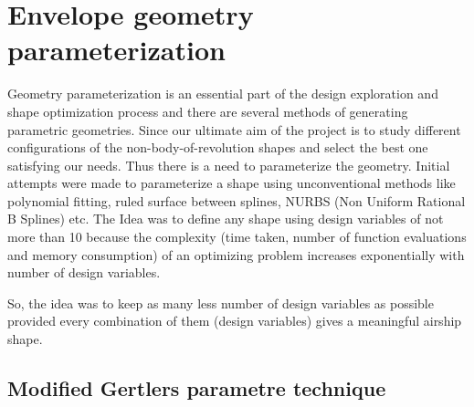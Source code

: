 \chapter{Envelope geometry parameterization}
\label{geometry}

Geometry parameterization is an essential part of the design exploration and shape optimization process and there are several methods of generating parametric geometries. Since our ultimate aim of the project is to study different configurations of the non-body-of-revolution shapes and select the best one satisfying our needs. Thus there is a need to parameterize the geometry. Initial attempts were made to parameterize a shape using unconventional methods like polynomial fitting, ruled surface between splines, NURBS (Non Uniform Rational B Splines) etc. The Idea was to define any shape using design variables of not more than 10 because the complexity (time taken, number of function evaluations and memory consumption) of an optimizing problem increases exponentially with number of design variables.

So, the idea was to keep as many less number of design variables as possible provided every combination of them (design variables) gives a meaningful airship shape.

\section{Modified Gertlers parametre technique}

